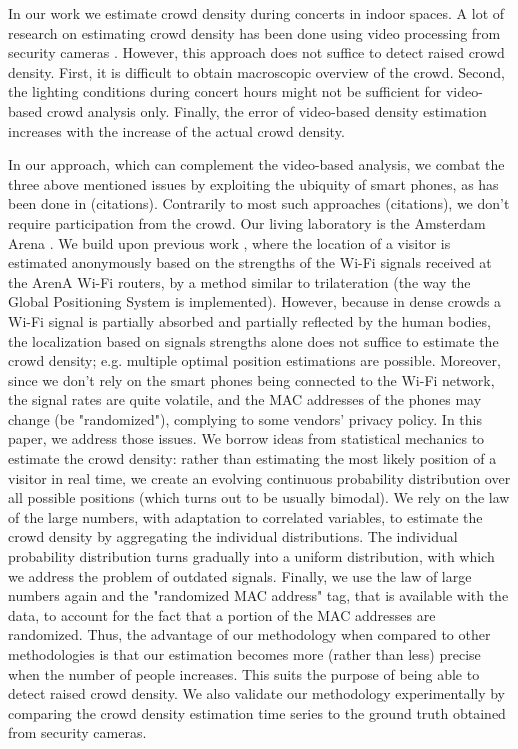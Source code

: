 \documentclass[10pt,a4paper]{article}
\begin{document}
In our work we estimate crowd density during concerts in indoor spaces. A lot of research on estimating crowd density has been done using video processing from security cameras \cite{Crowded_Scene_Analysis, Krausz2012307}. However, this approach does not suffice to detect raised crowd density. First, it is difficult to obtain macroscopic overview of the crowd. Second, 
the lighting conditions during concert hours might not be sufficient for video-based crowd analysis only. Finally, the error of video-based density estimation increases with the increase of the actual crowd density.  

In our approach, which can complement the video-based analysis, we combat the three above mentioned issues by exploiting the ubiquity of smart phones, as has been done in (citations). Contrarily to most such approaches (citations), we  don't require participation from the crowd. Our living laboratory is the Amsterdam Arena \cite{arena}.  We build upon previous work \cite{customers_jan}, where the location of a visitor is estimated anonymously based on the strengths of the Wi-Fi signals received at the ArenA Wi-Fi routers,  by a method similar to trilateration (the way the Global Positioning System is implemented). However, because in dense crowds a Wi-Fi signal is partially absorbed and partially reflected by the human bodies, the localization based on signals strengths alone does not suffice to estimate the crowd density; e.g. multiple optimal position estimations are possible.  Moreover, since we don't rely on the smart phones being connected to the Wi-Fi network, the signal rates are quite volatile, and the MAC addresses of the phones may change (be "randomized"), complying to some  vendors' privacy policy. In this paper, we address those issues. We borrow ideas from statistical mechanics to estimate the crowd density: rather than estimating the most likely position of a visitor in real time, we create an evolving continuous probability distribution over all possible positions (which turns out to be usually bimodal). We rely on the law of the large numbers, with adaptation to correlated variables, to estimate the crowd density by aggregating the individual distributions. The individual probability distribution turns gradually into a uniform distribution, with which we address the problem of outdated signals. Finally, we use the law of large numbers again and the "randomized MAC address" tag, that is available with the data, to account for the fact that a portion of the MAC addresses are randomized. Thus, the advantage of our methodology when compared to other methodologies is that our estimation becomes more (rather than less) precise when the number of people increases. This suits the purpose of being able to detect raised crowd density. 
We also validate our methodology experimentally by comparing the crowd density estimation time series to the ground truth obtained from security cameras. 
\end{document}
